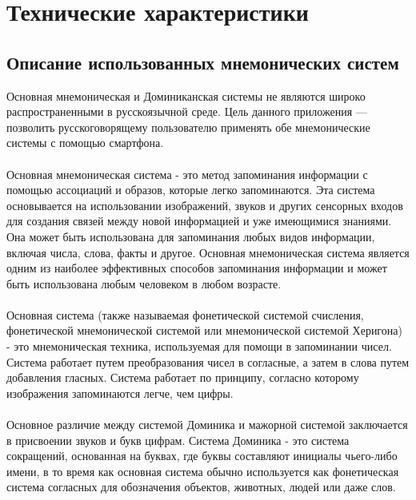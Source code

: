 \documentclass[draft]{article}
\begin{document}
\section{Технические характеристики}
\subsection{Описание использованных мнемонических систем}
Основная мнемоническая и Доминиканская системы не являются широко распространенными в русскоязычной среде. Цель данного приложения — позволить русскоговорящему пользователю применять обе мнемонические системы с помощью смартфона.\\
~\\
Основная мнемоническая система - это метод запоминания информации с помощью ассоциаций и образов, которые легко запоминаются. Эта система основывается на использовании изображений, звуков и других сенсорных входов для создания связей между новой информацией и уже имеющимися знаниями. Она может быть использована для запоминания любых видов информации, включая числа, слова, факты и другое. Основная мнемоническая система является одним из наиболее эффективных способов запоминания информации и может быть использована любым человеком в любом возрасте.\\
~\\
Основная система (также называемая фонетической системой счисления, фонетической мнемонической системой или мнемонической системой Херигона) - это мнемоническая техника, используемая для помощи в запоминании чисел. Система работает путем преобразования чисел в согласные, а затем в слова путем добавления гласных. Система работает по принципу, согласно которому изображения запоминаются легче, чем цифры.\\
~\\
Основное различие между системой Доминика и мажорной системой заключается в присвоении звуков и букв цифрам. Система Доминика - это система сокращений, основанная на буквах, где буквы составляют инициалы чьего-либо имени, в то время как основная система обычно используется как фонетическая система согласных для обозначения объектов, животных, людей или даже слов.
\end{document}
